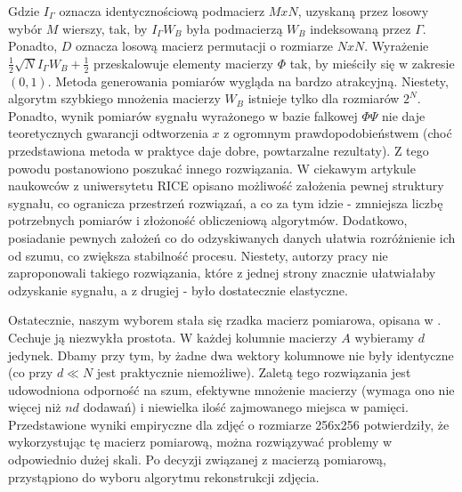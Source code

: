 Gdzie $I_\Gamma$ oznacza identycznościową podmacierz $M x N$, uzyskaną przez losowy wybór $M$ wierszy, tak, by $I_\Gamma W_B$ była podmacierzą $W_B$ indeksowaną przez $\Gamma$. Ponadto, $D$ oznacza losową macierz permutacji o rozmiarze $N x N$. Wyrażenie $\frac{1}{2} \sqrt{N} I_\Gamma W_B + \frac{1}{2}$ przeskalowuje elementy macierzy $\Phi$ tak, by mieściły się w zakresie $(0,1)$. Metoda generowania pomiarów wygląda na bardzo atrakcyjną. Niestety, algorytm szybkiego mnożenia macierzy $W_B$ istnieje tylko dla rozmiarów $2^N$. Ponadto, wynik pomiarów sygnału wyrażonego w bazie falkowej $\Phi \Psi$ nie daje teoretycznych gwarancji odtworzenia $x$ z ogromnym prawdopodobieństwem (choć przedstawiona metoda w praktyce daje dobre, powtarzalne rezultaty). Z tego powodu postanowiono poszukać innego rozwiązania. W ciekawym artykule naukowców z uniwersytetu RICE \cite{Baraniuk2010} opisano możliwość założenia pewnej struktury sygnału, co ogranicza przestrzeń rozwiązań, a co za tym idzie - zmniejsza liczbę potrzebnych pomiarów i złożoność obliczeniową algorytmów. Dodatkowo, posiadanie pewnych założeń co do odzyskiwanych danych ułatwia rozróżnienie ich od szumu, co zwiększa stabilność procesu. Niestety, autorzy pracy nie zaproponowali takiego rozwiązania, które z jednej strony znacznie ułatwiałaby odzyskanie sygnału, a z drugiej - było dostatecznie elastyczne. 

Ostatecznie, naszym wyborem stała się rzadka macierz pomiarowa, opisana w \cite{Berinde2008}. Cechuje ją niezwykła prostota. W każdej kolumnie macierzy $A$ wybieramy $d$ jedynek. Dbamy przy tym, by żadne dwa wektory kolumnowe nie były identyczne (co przy $d \ll N$ jest praktycznie niemożliwe). Zaletą tego rozwiązania jest udowodniona odporność na szum, efektywne mnożenie macierzy (wymaga ono nie więcej niż $nd$ dodawań) i niewielka ilość zajmowanego miejsca w pamięci. Przedstawione wyniki empiryczne dla zdjęć o rozmiarze 256x256 potwierdziły, że wykorzystując tę macierz pomiarową, można rozwiązywać problemy w odpowiednio dużej skali. Po decyzji związanej z macierzą pomiarową, przystąpiono do wyboru algorytmu rekonstrukcji zdjęcia.

